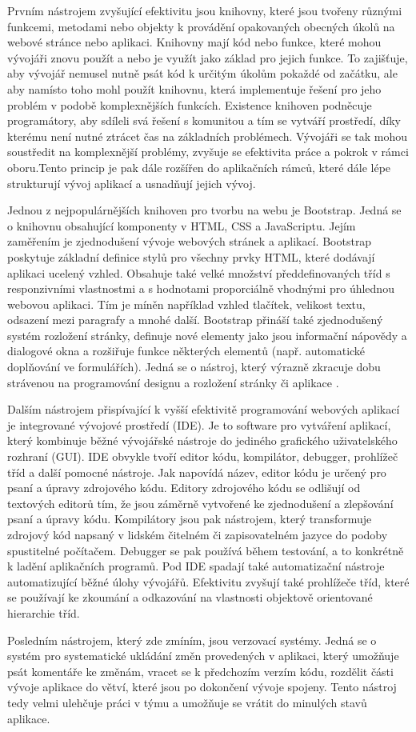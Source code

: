 Prvním nástrojem zvyšující efektivitu jsou knihovny, které jsou tvořeny různými funkcemi, metodami nebo objekty k provádění opakovaných obecných úkolů na webové stránce nebo aplikaci. Knihovny mají kód nebo funkce, které mohou vývojáři znovu použít a nebo je využít jako základ pro jejich funkce. To zajišťuje, aby vývojář nemusel nutně psát kód k určitým úkolům pokaždé od začátku, ale aby namísto toho mohl použít knihovnu, která implementuje řešení pro jeho problém v podobě komplexnějších funkcích. Existence knihoven podněcuje programátory, aby sdíleli svá řešení s komunitou a tím se vytváří prostředí, díky kterému není nutné ztrácet čas na základních problémech. Vývojáři se tak mohou soustředit na komplexnější problémy, zvyšuje se efektivita práce a pokrok v rámci oboru.Tento princip je pak dále rozšířen do aplikačních rámců, které dále lépe strukturují vývoj aplikací a usnadňují jejich vývoj.

Jednou z nejpopulárnějších knihoven pro tvorbu na webu je Bootstrap. Jedná se o knihovnu obsahující komponenty v HTML, CSS a JavaScriptu. Jejím zaměřením je zjednodušení vývoje webových stránek a aplikací. Bootstrap poskytuje základní definice stylů pro všechny prvky HTML, které dodávají aplikaci ucelený vzhled. Obsahuje také velké množství předdefinovaných tříd s responzivními vlastnostmi a s hodnotami proporciálně vhodnými pro úhlednou webovou aplikaci. Tím je míněn například vzhled tlačítek, velikost textu, odsazení mezi paragrafy a mnohé další. Bootstrap přináší také zjednodušený systém rozložení stránky, definuje nové elementy jako jsou informační nápovědy a dialogové okna a rozšiřuje funkce některých elementů (např. automatické doplňování ve formulářích). Jedná se o nástroj, který výrazně zkracuje dobu strávenou na programování designu a rozložení stránky či aplikace \cite{bootstrapbook}.

Dalším nástrojem přispívající k vyšší efektivitě programování webových aplikací je integrované vývojové prostředí (IDE). Je to software pro vytváření aplikací, který kombinuje běžné vývojářské nástroje do jediného grafického uživatelského rozhraní (GUI). IDE obvykle tvoří editor kódu, kompilátor, debugger, prohlížeč tříd a další pomocné nástroje. Jak napovídá název, editor kódu je určený pro psaní a úpravy zdrojového kódu. Editory zdrojového kódu se odlišují od textových editorů tím, že jsou záměrně vytvořené ke zjednodušení a zlepšování psaní a úpravy kódu. Kompilátory jsou pak nástrojem, který transformuje zdrojový kód napsaný v lidském čitelném či zapisovatelném jazyce do podoby spustitelné počítačem. Debugger se pak používá během testování, a to konkrétně k ladění aplikačních programů. Pod IDE spadají také automatizační nástroje automatizující běžné úlohy vývojářů. Efektivitu zvyšují také prohlížeče tříd, které se používají ke zkoumání a odkazování na vlastnosti objektově orientované hierarchie tříd.

Posledním nástrojem, který zde zmíním, jsou verzovací systémy. Jedná se o systém pro systematické ukládání změn provedených v aplikaci, který umožňuje psát komentáře ke změnám, vracet se k předchozím verzím kódu, rozdělit části vývoje aplikace do větví, které jsou po dokončení vývoje spojeny. Tento nástroj tedy velmi ulehčuje práci v týmu a umožňuje se vrátit do minulých stavů aplikace.
